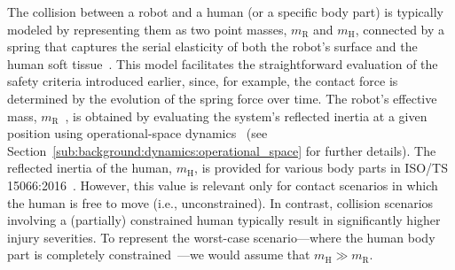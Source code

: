 The collision between a robot and a human (or a specific body part) is typically modeled by representing them as two point masses, $m_\mathrm{R}$ and $m_\mathrm{H}$, connected by a spring that captures the serial elasticity of both the robot’s surface and the human soft tissue~\citep{bicchi2004fast, haddadin2009requirements, iso2016collaborative}. This model facilitates the straightforward evaluation of the safety criteria introduced earlier, since, for example, the contact force is determined by the evolution of the spring force over time. The robot’s effective mass, $m_\mathrm{R}$~\citep{kirschner2021notion}, is obtained by evaluating the system’s reflected inertia at a given position using operational-space dynamics~\citep{khatib1987unified} (see Section~\ref{sub:background:dynamics:operational_space} for further details). The reflected inertia of the human, $m_\mathrm{H}$, is provided for various body parts in ISO/TS 15066:2016~\citep{iso2016collaborative}. However, this value is relevant only for contact scenarios in which the human is free to move (i.e., unconstrained). In contrast, collision scenarios involving a (partially) constrained human typically result in significantly higher injury severities. To represent the worst-case scenario—where the human body part is completely constrained~\citep{haddadin2009requirements, haddadin2011safe}—we would assume that $m_\mathrm{H} \gg m_\mathrm{R}$.

